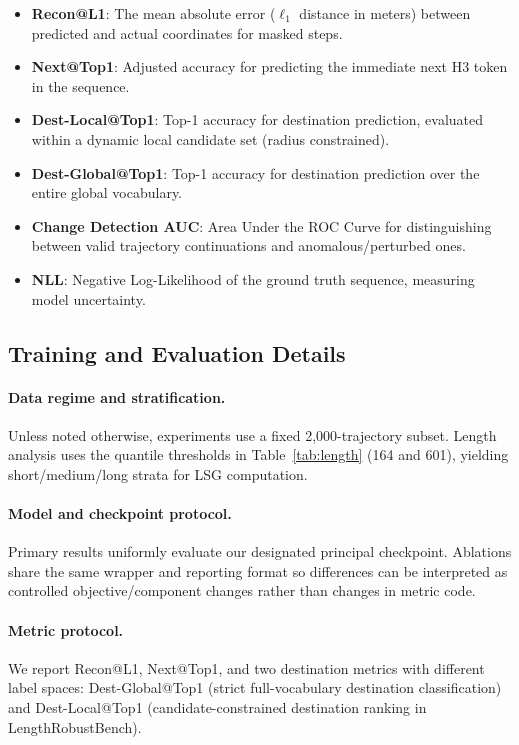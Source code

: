 \documentclass{article}
\begin{document}
\begin{itemize}
    \item \textbf{Recon@L1}: The mean absolute error ($\ell_1$ distance in meters) between predicted and actual coordinates for masked steps.
    \item \textbf{Next@Top1}: Adjusted accuracy for predicting the immediate next H3 token in the sequence.
    \item \textbf{Dest-Local@Top1}: Top-1 accuracy for destination prediction, evaluated within a dynamic local candidate set (radius constrained).
    \item \textbf{Dest-Global@Top1}: Top-1 accuracy for destination prediction over the entire global vocabulary.
    \item \textbf{Change Detection AUC}: Area Under the ROC Curve for distinguishing between valid trajectory continuations and anomalous/perturbed ones.
    \item \textbf{NLL}: Negative Log-Likelihood of the ground truth sequence, measuring model uncertainty.
\end{itemize}

\subsection{Training and Evaluation Details}
\paragraph{Data regime and stratification.}
Unless noted otherwise, experiments use a fixed 2,000-trajectory subset. Length analysis uses the quantile thresholds in Table~\ref{tab:length} (164 and 601), yielding short/medium/long strata for LSG computation.

\paragraph{Model and checkpoint protocol.}
Primary results uniformly evaluate our designated principal checkpoint. Ablations share the same wrapper and reporting format so differences can be interpreted as controlled objective/component changes rather than changes in metric code.

\paragraph{Metric protocol.}
We report Recon@L1, Next@Top1, and two destination metrics with different label spaces: Dest-Global@Top1 (strict full-vocabulary destination classification) and Dest-Local@Top1 (candidate-constrained destination ranking in LengthRobustBench).
\end{document}

